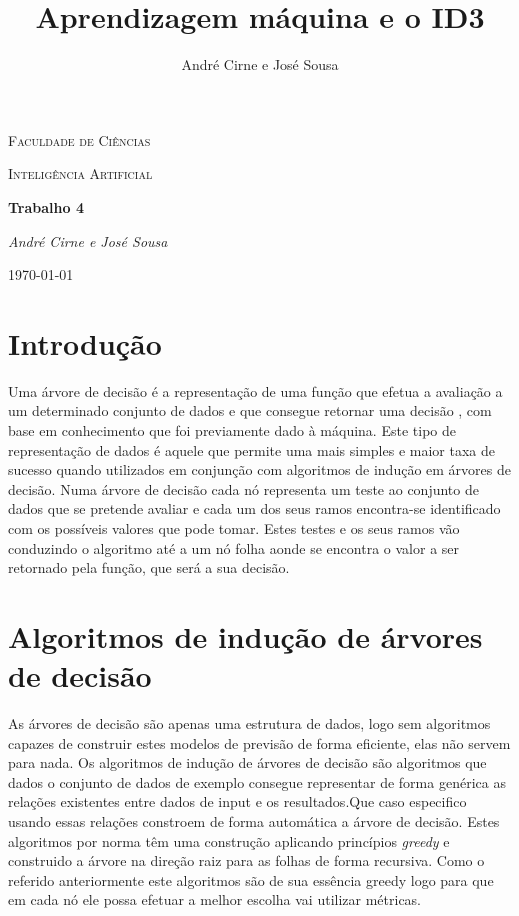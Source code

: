 \documentclass[12pt,a4paper]{article}
\author{André Cirne e José Sousa}
\title{Aprendizagem máquina e o ID3}
\begin{document}
	
\begin{titlepage}
	\centering
	{\scshape\LARGE Faculdade de Ciências \par}
	\vspace{1cm}
	{\scshape\Large Inteligência Artificial\par}
	\vspace{1.5cm}
	{\huge\bfseries Trabalho 4\par}
	\vspace{2cm}
	{\Large\itshape André Cirne e José Sousa\par}
	\vfill
	
	{\large \today\par}
\end{titlepage}

\tableofcontents

\section{Introdução}
Uma árvore de decisão é a representação de uma função que efetua a avaliação a um determinado conjunto de dados e que consegue retornar uma decisão \cite{stuart2016artificial}, com base em conhecimento que foi previamente dado à máquina. Este tipo de representação de dados é aquele que permite uma mais simples e maior taxa de sucesso quando utilizados em conjunção com algoritmos de indução em árvores de decisão.
Numa árvore de decisão cada nó representa um teste ao conjunto de dados que se pretende avaliar e cada um dos seus ramos encontra-se identificado com os possíveis valores que pode tomar. Estes testes e os seus ramos vão conduzindo o algoritmo até a um nó folha aonde se encontra o valor a ser retornado pela função, que será a sua decisão.

\section{Algoritmos de indução de árvores de decisão}
As árvores de decisão são apenas uma estrutura de dados, logo sem algoritmos capazes de construir estes modelos de previsão de forma eficiente, elas não servem para nada.
Os algoritmos de indução de árvores de decisão são algoritmos que dados o conjunto de dados de exemplo consegue representar de forma genérica as relações existentes entre dados de input e os resultados.Que caso especifico usando essas relações constroem de forma automática a árvore de decisão.\cite{rokach2005top} Estes algoritmos por norma têm uma construção aplicando princípios \textit{greedy} e construido a árvore na direção raiz para as folhas de forma recursiva.
Como o referido anteriormente este algoritmos são de sua essência greedy logo para que em cada nó ele possa efetuar a melhor escolha vai utilizar métricas.
\end{document}
